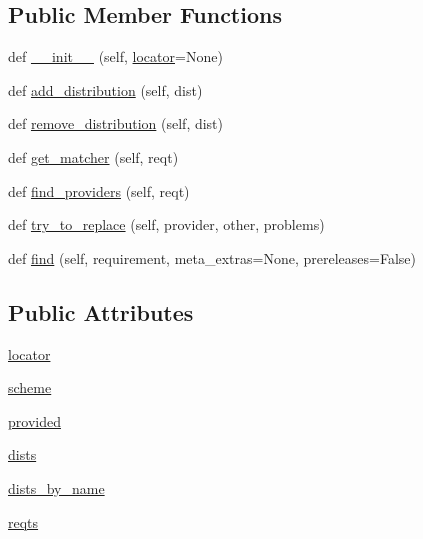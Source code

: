 \subsection*{Public Member Functions}
\begin{DoxyCompactItemize}
\item 
def \hyperlink{classpip_1_1__vendor_1_1distlib_1_1locators_1_1DependencyFinder_a884dbcb6f6d3c0996c218834d06fc48c}{\+\_\+\+\_\+init\+\_\+\+\_\+} (self, \hyperlink{classpip_1_1__vendor_1_1distlib_1_1locators_1_1DependencyFinder_af5d15a4b648c9474454323afb55d388a}{locator}=None)
\item 
def \hyperlink{classpip_1_1__vendor_1_1distlib_1_1locators_1_1DependencyFinder_a256ba1ddbc7415fedc398a1c9acc90ae}{add\+\_\+distribution} (self, dist)
\item 
def \hyperlink{classpip_1_1__vendor_1_1distlib_1_1locators_1_1DependencyFinder_a59c66e9bfaeefec64bd58bb58e5427ec}{remove\+\_\+distribution} (self, dist)
\item 
def \hyperlink{classpip_1_1__vendor_1_1distlib_1_1locators_1_1DependencyFinder_abc4b69b38d73d3501a3cf44eadf39528}{get\+\_\+matcher} (self, reqt)
\item 
def \hyperlink{classpip_1_1__vendor_1_1distlib_1_1locators_1_1DependencyFinder_ac3932b4a3b8d90ee83ae21a847619727}{find\+\_\+providers} (self, reqt)
\item 
def \hyperlink{classpip_1_1__vendor_1_1distlib_1_1locators_1_1DependencyFinder_ae5188bef19f3bfb756cb122d2ffbd6a7}{try\+\_\+to\+\_\+replace} (self, provider, other, problems)
\item 
def \hyperlink{classpip_1_1__vendor_1_1distlib_1_1locators_1_1DependencyFinder_a5819c2bb2cd8f2467194e31cd08e7269}{find} (self, requirement, meta\+\_\+extras=None, prereleases=False)
\end{DoxyCompactItemize}
\subsection*{Public Attributes}
\begin{DoxyCompactItemize}
\item 
\hyperlink{classpip_1_1__vendor_1_1distlib_1_1locators_1_1DependencyFinder_af5d15a4b648c9474454323afb55d388a}{locator}
\item 
\hyperlink{classpip_1_1__vendor_1_1distlib_1_1locators_1_1DependencyFinder_a5cbf9ff0e487307e9ba594c95e29eccb}{scheme}
\item 
\hyperlink{classpip_1_1__vendor_1_1distlib_1_1locators_1_1DependencyFinder_a10a6892b039a71d5517977dc22cbf79b}{provided}
\item 
\hyperlink{classpip_1_1__vendor_1_1distlib_1_1locators_1_1DependencyFinder_a6f9eef84e7877dae26151fdecc1b0c38}{dists}
\item 
\hyperlink{classpip_1_1__vendor_1_1distlib_1_1locators_1_1DependencyFinder_a86978c9b883283e34d3f978d93dca928}{dists\+\_\+by\+\_\+name}
\item 
\hyperlink{classpip_1_1__vendor_1_1distlib_1_1locators_1_1DependencyFinder_ac940cc5cdb7c6291d9a581a247e3fc24}{reqts}
\end{DoxyCompactItemize}


